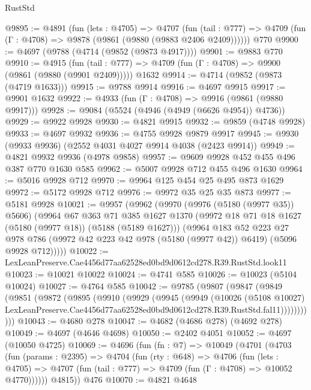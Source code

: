 \begin{lexlean}{RustStd}
\begin{coremodule}
@9895 := @4891
    (fun (lets : @4705) =>
    @4707
      (fun (tail : @777) => @4709 (fun (Γ : @4708) => @9878 (@9861 (@9880 (@9883 @2406 @2409))))))
    @770
@9900 := @4697 (@9788 (@4714 (@9852 (@9873 @4917))))
@9901 := @9883 @770
@9910 := @4915
    (fun (tail : @777) => @4709 (fun (Γ : @4708) => @9900 (@9861 (@9880 (@9901 @2409)))))
    @1632
@9914 := @4714 (@9852 (@9873 (@4719 @1633)))
@9915 := @9788 @9914
@9916 := @4697 @9915
@9917 := @9901 @1632
@9922 := @4933 (fun (Γ : @4708) => @9916 (@9861 (@9880 @9917)))
@9928 := @9084 (@5524 (@4946 (@4949 (@6626 @4954)) @4736))
@9929 := @9922 @9928
@9930 := @4821 @9915
@9932 := @9859 (@4748 @9928)
@9933 := @4697 @9932
@9936 := @4755 @9928 @9879 @9917
@9945 := @9930 (@9933 @9936) (@2552 @4031 @4027 @9914 @4038 (@2423 @9914))
@9949 := @4821 @9932 @9936 (@4978 @9858)
@9957 := @9609 @9928 @452 @455 @496 @387 @770 @1630 @585
@9962 := @5007 @9928 @712 @455 @496 @1630
@9964 := @5016 @9928 @712
@9970 := @9964 @125 @454 @25 @495 @873 @1629
@9972 := @5172 @9928 @712
@9976 := @9972 @35 @25 @35 @873
@9977 := @5181 @9928
@10021 := @9957
    (@9962
      (@9970
        (@9976 (@5180 (@9977 @35)) @5606)
        (@9964
          @67
          @363
          @71
          @385
          @1627
          @1370
          (@9972 @18 @71 @18 @1627 (@5180 (@9977 @18)) (@5188 (@5189 @1627)))
          (@9964
            @183
            @52
            @223
            @27
            @978
            @786
            (@9972 @42 @223 @42 @978 (@5180 (@9977 @42)) @6419)
            (@5096 @9928 @712)))))
@10022 := LexLeanPreserve.Cae4456d77aa62528ed0bd9d0612cd278.R39.RustStd.look11
@10023 := @10021 @10022
@10024 := @4741 @585
@10026 := @10023 (@5104 @10024)
@10027 := @4764 @585
@10042 := @9785
    (@9807
      (@9847
        (@9849
          (@9851
            (@9872
              (@9895
                (@9910
                  (@9929
                    (@9945
                      (@9949
                        (@10026
                          (@5108 @10027)
                          LexLeanPreserve.Cae4456d77aa62528ed0bd9d0612cd278.R39.RustStd.fal11)))))))))))
@10043 := @4680 @278
@10047 := @4682 (@4686 @278) (@4692 @278)
@10049 := @4697 (@4646 @4698)
@10050 := @2402 @4051
@10052 := @4697 (@10050 @4725)
@10069 := @4696
    (fun (fn : @7) =>
    @10049
      (@4701
        (@4703
          (fun (params : @2395) =>
          @4704
            (fun (rty : @648) =>
            @4706
              (fun (lets : @4705) =>
              @4707 (fun (tail : @777) => @4709 (fun (Γ : @4708) => @10052 @4770))))))
        @4815))
    @476
@10070 := @4821 @4648

\end{coremodule}
\end{lexlean}
